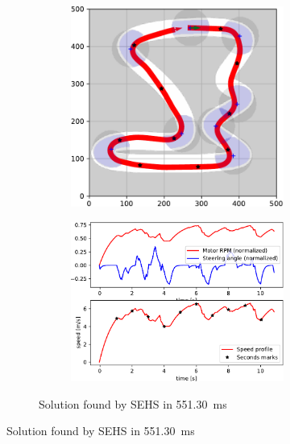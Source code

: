 \begin{figure}[!tbp]
	\vspace{0.75cm}
	
	\begin{subfigure}[t]{\textwidth}
		\begin{subfigure}[t]{0.45\textwidth}
			\includegraphics[width=\textwidth]{../img/experiments/tornado-sehs-trajectory}
		\end{subfigure}
		\hfill
		\begin{subfigure}[t]{0.45\textwidth}
			\includegraphics[width=\textwidth]{../img/experiments/tornado-sehs-actuators}
		\end{subfigure}
		\caption{Solution found by SEHS in \SI{551.30}{\milli\second}}
		\label{fig:solution_tornado-sehs}
	\end{subfigure}
	

\end{figure}
